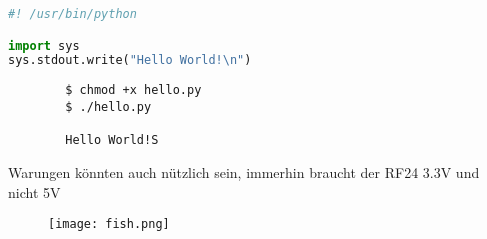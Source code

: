 \documentclass{article}
\begin{document}

\begin{file}[hello.py]
\begin{lstlisting}[language=Python]
#! /usr/bin/python

import sys
sys.stdout.write("Hello World!\n")
\end{lstlisting}
\end{file}



\begin{commandline}
	\begin{verbatim}
		$ chmod +x hello.py
		$ ./hello.py

		Hello World!S
	\end{verbatim}
\end{commandline}


\begin{warn}[Notice:]
  Warungen könnten auch nützlich sein, immerhin braucht der RF24 3.3V und nicht 5V
\end{warn}


\begin{figure}[h]
	\texttt{[image: fish.png]}
	\centering
\end{figure}






\end{document}

